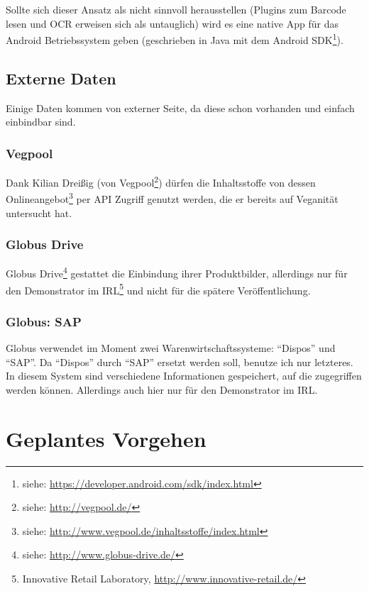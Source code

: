 \documentclass[a4paper]{report}
\begin{document}
Sollte sich dieser Ansatz als nicht sinnvoll herausstellen (Plugins
zum Barcode lesen und OCR erweisen sich als untauglich) wird es eine
native App für das Android Betriebssystem geben (geschrieben in Java
mit dem Android SDK\footnote{siehe:
\url{https://developer.android.com/sdk/index.html}}).

\clearpage
\section{Externe Daten}

Einige Daten kommen von externer Seite, da diese schon vorhanden und
einfach einbindbar sind.

\subsection{Vegpool}

Dank Kilian Drei{\ss}ig (von Vegpool\footnote{siehe:
\url{http://vegpool.de/}})
dürfen die Inhaltsstoffe von dessen Onlineangebot\footnote{siehe:
\url{http://www.vegpool.de/inhaltsstoffe/index.html}}
per API Zugriff genutzt werden, die er bereits auf Veganität
untersucht hat.

\subsection{Globus Drive}

Globus Drive\footnote{siehe: \url{http://www.globus-drive.de/}} gestattet die
Einbindung ihrer Produktbilder, allerdings nur für den Demonstrator
im IRL\footnote{\label{irl}Innovative
Retail Laboratory, \url{http://www.innovative-retail.de/}} und nicht für die
spätere Veröffentlichung.

\subsection{Globus: SAP}

Globus verwendet im Moment zwei Warenwirtschaftssysteme: ``Dispos'' und ``SAP''.
Da ``Dispos'' durch ``SAP'' ersetzt werden soll, benutze ich nur
letzteres.
In diesem System sind verschiedene Informationen gespeichert, auf
die zugegriffen werden können. Allerdings auch hier nur für den
Demonstrator im IRL.

\chapter{Geplantes Vorgehen}
\label{chap:vorgehen}
\end{document}
